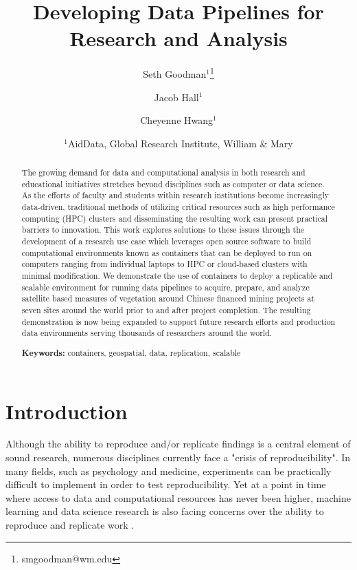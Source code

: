 \documentclass[a4paper]{article}
\title{Developing Data Pipelines for Research and Analysis}
\author{Seth Goodman$^1$\thanks{smgoodman@wm.edu} \and Jacob Hall$^1$ \and Cheyenne Hwang$^1$}
\date{
    $^1$AidData, Global Research Institute, William \& Mary \\ 
}
\begin{document}
\maketitle


\begin{abstract}

The growing demand for data and computational analysis in both research and educational initiatives stretches beyond disciplines such as computer or data science. As the efforts of faculty and students within research institutions become increasingly data-driven, traditional methods of utilizing critical resources such as high performance computing (HPC) clusters and disseminating the resulting work can present practical barriers to innovation. This work explores solutions to these issues through the development of a research use case which leverages open source software to build computational environments known as containers that can be deployed to run on computers ranging from individual laptops to HPC or cloud-based clusters with minimal modification. We demonstrate the use of containers to deploy a replicable and scalable environment for running data pipelines to acquire, prepare, and analyze satellite based measures of vegetation around Chinese financed mining projects at seven sites around the world prior to and after project completion. The resulting demonstration is now being expanded to support future research efforts and production data environments serving thousands of researchers around the world.

\noindent\textbf{Keywords:} containers, geospatial, data, replication, scalable
\end{abstract}


\section{Introduction}

Although the ability to reproduce and/or replicate findings is a central element of sound research, numerous disciplines currently face a "crisis of reproducibility"\citep{Baker2016}. In many fields, such as psychology and medicine, experiments can be practically difficult to implement in order to test reproducibility. Yet at a point in time where access to data and computational resources has never been higher, machine learning and data science research is also facing concerns over the ability to reproduce and replicate work \citep{Ding2020}.
\end{document}
